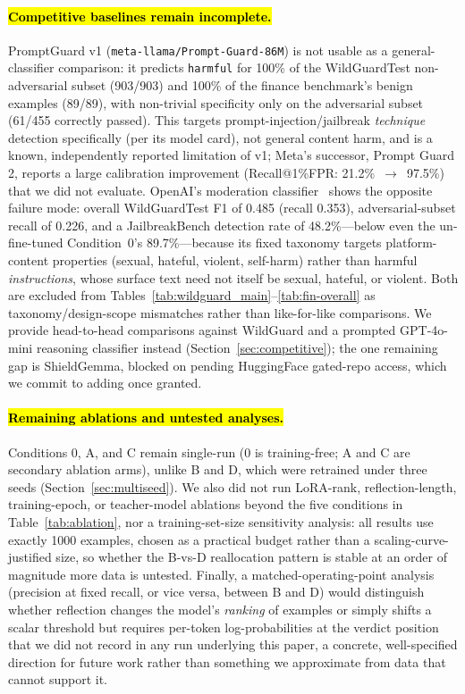 \documentclass[superintelligence,article,accept,moreauthors]{Definitions/mdpi}
\begin{document}
\paragraph{\hl{Competitive baselines remain incomplete.}}
PromptGuard v1 (\texttt{meta-llama/Prompt-Guard-86M}) is not usable as a general-classifier comparison: it predicts \texttt{harmful} for 100\% of the WildGuardTest non-adversarial subset (903/903) and 100\% of the finance benchmark's benign examples (89/89), with non-trivial specificity only on the adversarial subset (61/455 correctly passed). This targets prompt-injection/jailbreak \emph{technique} detection specifically (per its model card), not general content harm, and is a known, independently reported limitation of v1; Meta's successor, Prompt Guard 2, reports a large calibration improvement (Recall@1\%FPR: 21.2\%~$\to$~97.5\%) that we did not evaluate. OpenAI's moderation classifier~\citep{markov2023holistic} shows the opposite failure mode: overall WildGuardTest F1 of 0.485 (recall 0.353), adversarial-subset recall of 0.226, and a JailbreakBench detection rate of 48.2\%---below even the un-fine-tuned Condition~0's 89.7\%---because its fixed taxonomy targets platform-content properties (sexual, hateful, violent, self-harm) rather than harmful \emph{instructions}, whose surface text need not itself be sexual, hateful, or violent. Both are excluded from Tables~\ref{tab:wildguard_main}--\ref{tab:fin-overall} as taxonomy/design-scope mismatches rather than like-for-like comparisons. We provide head-to-head comparisons against WildGuard and a prompted GPT-4o-mini reasoning classifier instead (Section~\ref{sec:competitive}); the one remaining gap is ShieldGemma, blocked on pending HuggingFace gated-repo access, which we commit to adding once granted.

\paragraph{\hl{Remaining ablations and untested analyses.}}
Conditions 0, A, and C remain single-run (0 is training-free; A and C are secondary ablation arms), unlike B and D, which were retrained under three seeds (Section~\ref{sec:multiseed}). We also did not run LoRA-rank, reflection-length, training-epoch, or teacher-model ablations beyond the five conditions in Table~\ref{tab:ablation}, nor a training-set-size sensitivity analysis: all results use exactly 1000 examples, chosen as a practical budget rather than a scaling-curve-justified size, so whether the B-vs-D reallocation pattern is stable at an order of magnitude more data is untested. Finally, a matched-operating-point analysis (precision at fixed recall, or vice versa, between B and D) would distinguish whether reflection changes the model's \emph{ranking} of examples or simply shifts a scalar threshold but requires per-token log-probabilities at the verdict position that we did not record in any run underlying this paper, a concrete, well-specified direction for future work rather than something we approximate from data that cannot support it.
\end{document}
